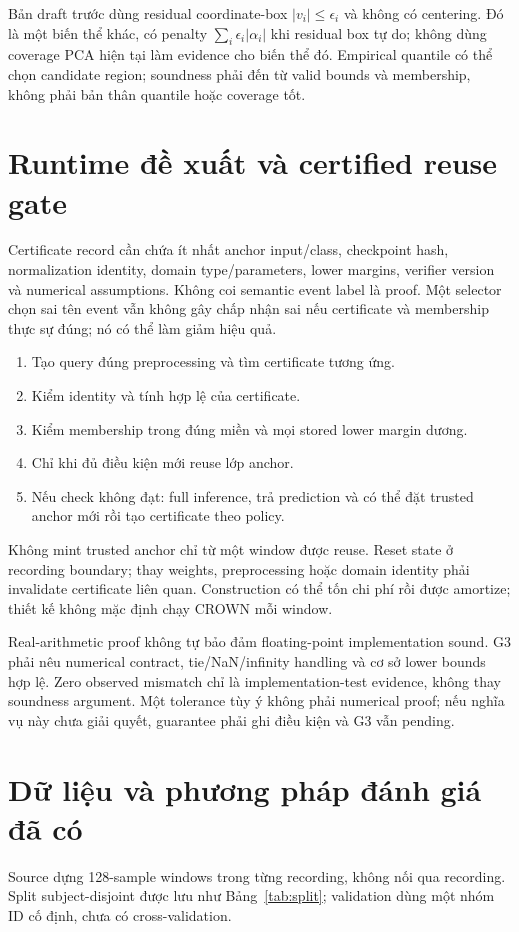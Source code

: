 \documentclass[11pt,a4paper]{article}
\begin{document}
Bản draft trước dùng residual coordinate-box \(|v_i|\le\epsilon_i\) và
không có centering. Đó là một biến thể khác, có penalty
\(\sum_i\epsilon_i|\alpha_i|\) khi residual box tự do; không dùng coverage
PCA hiện tại làm evidence cho biến thể đó. Empirical quantile có thể chọn
candidate region; soundness phải đến từ valid bounds và membership,
không phải bản thân quantile hoặc coverage tốt.

\section{Runtime đề xuất và certified reuse gate}
Certificate record cần chứa ít nhất anchor input/class, checkpoint hash,
normalization identity, domain type/parameters, lower margins, verifier
version và numerical assumptions. Không coi semantic event label là proof.
Một selector chọn sai tên event vẫn không gây chấp nhận sai nếu certificate
và membership thực sự đúng; nó có thể làm giảm hiệu quả.

\begin{enumerate}
\item Tạo query đúng preprocessing và tìm certificate tương ứng.
\item Kiểm identity và tính hợp lệ của certificate.
\item Kiểm membership trong đúng miền và mọi stored lower margin dương.
\item Chỉ khi đủ điều kiện mới reuse lớp anchor.
\item Nếu check không đạt: full inference, trả prediction và có thể đặt
trusted anchor mới rồi tạo certificate theo policy.
\end{enumerate}
Không mint trusted anchor chỉ từ một window được reuse. Reset state ở
recording boundary; thay weights, preprocessing hoặc domain identity phải
invalidate certificate liên quan. Construction có thể tốn chi phí rồi được
amortize; thiết kế không mặc định chạy CROWN mỗi window.

Real-arithmetic proof không tự bảo đảm floating-point implementation sound.
G3 phải nêu numerical contract, tie/NaN/infinity handling và cơ sở lower
bounds hợp lệ. Zero observed mismatch chỉ là implementation-test evidence,
không thay soundness argument. Một tolerance tùy ý không phải numerical proof;
nếu nghĩa vụ này chưa giải quyết, guarantee phải ghi điều kiện và G3 vẫn pending.

\section{Dữ liệu và phương pháp đánh giá đã có}
Source dựng 128-sample windows trong từng recording, không nối qua recording.
Split subject-disjoint được lưu như Bảng~\ref{tab:split}; validation dùng
một nhóm ID cố định, chưa có cross-validation.
\end{document}
